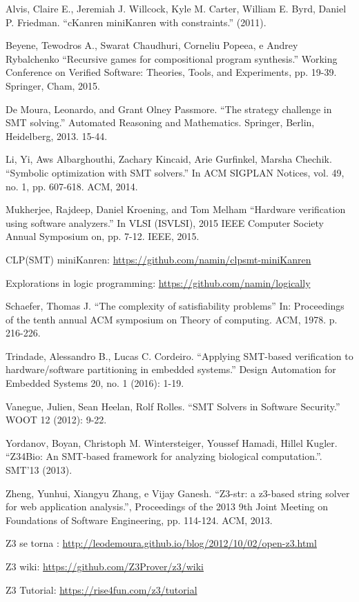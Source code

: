 \documentclass{article}
\begin{document}
\begin{thebibliography}{99}

 Alvis, Claire E., Jeremiah J. Willcock, Kyle
  M. Carter, William E. Byrd, Daniel P. Friedman.
  ``cKanren miniKanren with constraints.'' (2011).
  
 Beyene, Tewodros A., Swarat Chaudhuri, Corneliu
  Popeea, e Andrey Rybalchenko
  ``Recursive games for compositional program synthesis.''
  Working Conference on Verified Software: Theories, Tools, and
  Experiments, pp. 19-39. Springer, Cham, 2015.

 De Moura, Leonardo, and Grant Olney Passmore.
  ``The strategy challenge in SMT solving.''
  Automated Reasoning and Mathematics. Springer, Berlin, Heidelberg,
  2013. 15-44.
  
 Li, Yi, Aws Albarghouthi, Zachary Kincaid, Arie
  Gurfinkel,  Marsha Chechik.
  ``Symbolic optimization with SMT solvers.''
  In ACM SIGPLAN Notices, vol. 49, no. 1, pp. 607-618. ACM, 2014.

 Mukherjee, Rajdeep, Daniel Kroening, and Tom
  Melham
  ``Hardware verification using software analyzers.'' In VLSI
  (ISVLSI), 2015 IEEE Computer Society Annual Symposium on,
  pp. 7-12. IEEE, 2015.

 CLP(SMT) miniKanren:
  \url{https://github.com/namin/clpsmt-miniKanren}

 Explorations in logic programming:
  \url{https://github.com/namin/logically}

 Schaefer, Thomas J.
  ``The complexity of satisfiability problems''
  In: Proceedings of the tenth annual ACM symposium on Theory of
  computing. ACM, 1978. p. 216-226.
  
 Trindade, Alessandro B., Lucas C. Cordeiro.
  ``Applying SMT-based verification to hardware/software partitioning
  in embedded systems.''
  Design Automation for Embedded Systems 20, no. 1 (2016): 1-19.

 Vanegue, Julien, Sean Heelan, Rolf Rolles.
  ``SMT Solvers in Software Security.'' WOOT 12 (2012): 9-22.
  
 Yordanov, Boyan, Christoph M. Wintersteiger,
  Youssef Hamadi, Hillel Kugler.
  ``Z34Bio: An SMT-based framework for analyzing biological
  computation.''. SMT’13 (2013).

 Zheng, Yunhui, Xiangyu Zhang, e Vijay Ganesh.
  ``Z3-str: a z3-based string solver for web application analysis.'',
  Proceedings of the 2013 9th Joint Meeting on Foundations of
  Software Engineering, pp. 114-124. ACM, 2013. 

 Z3 se torna :
  \url{http://leodemoura.github.io/blog/2012/10/02/open-z3.html}
  
 Z3 wiki: \url{https://github.com/Z3Prover/z3/wiki}

 Z3 Tutorial: \url{https://rise4fun.com/z3/tutorial}

\end{thebibliography}
\end{document}
